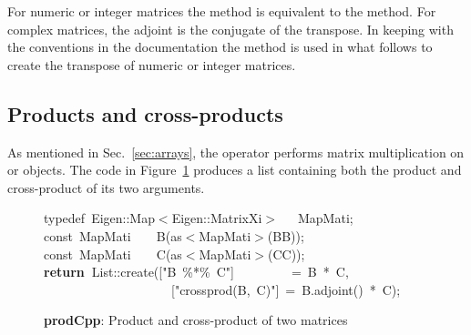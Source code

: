 \documentclass[shortnames,article]{jss}
\newcommand{\hlstd}[1]{\textcolor[rgb]{0,0,0}{#1}}
\newcommand{\hlopt}[1]{\textcolor[rgb]{0,0,0}{#1}}
\newcommand{\hlstr}[1]{\textcolor[rgb]{0.90,0.15,0.15}{#1}}
\newcommand{\hlkwa}[1]{\textcolor[rgb]{0.61,0.13,0.93}{\bf{#1}}}
\newcommand{\hlkwb}[1]{\textcolor[rgb]{0.13,0.54,0.13}{#1}}
\newcommand{\hlkwc}[1]{\textcolor[rgb]{0,0,1}{#1}}
\newcommand{\hlkwd}[1]{\textcolor[rgb]{0,0,0}{#1}}
\begin{document}
For numeric or integer matrices the  method is
equivalent to the  method.  For complex matrices,
the adjoint is the conjugate of the transpose.  In keeping with the
conventions in the  documentation the 
method is used in what follows to create the transpose of numeric or
integer matrices.


\subsection{Products and cross-products}
\label{sec:products}

As mentioned in Sec.~\ref{sec:arrays}, the  operator
performs matrix multiplication on  or
 objects. The  code in
Figure~\ref{prod} produces a list containing both the product and
cross-product of its two arguments.

\begin{figure}[htb]
  \noindent
  \ttfamily
  \hlstd{}\hlkwc{typedef\ }\hlstd{Eigen}\hlopt{::}\hlstd{Map}\hlopt{$<$}\hlstd{Eigen}\hlopt{::}\hlstd{MatrixXi}\hlopt{$>$}\hlstd{\ \ \ }\hlopt{}\hlstd{MapMati}\hlopt{;}\hspace*{\fill}\\
  \hlstd{}\hlkwb{const\ }\hlstd{MapMati}\hlstd{\ \ \ \ }\hlstd{}\hlkwd{B}\hlstd{}\hlopt{(}\hlstd{as}\hlopt{$<$}\hlstd{MapMati}\hlopt{$>$(}\hlstd{BB}\hlopt{));}\hspace*{\fill}\\
  \hlstd{}\hlkwb{const\ }\hlstd{MapMati}\hlstd{\ \ \ \ }\hlstd{}\hlkwd{C}\hlstd{}\hlopt{(}\hlstd{as}\hlopt{$<$}\hlstd{MapMati}\hlopt{$>$(}\hlstd{CC}\hlopt{));}\hspace*{\fill}\\
  \hlstd{}\hlkwa{return\ }\hlstd{List}\hlopt{::}\hlstd{}\hlkwd{create}\hlstd{}\hlopt{(}\hlstd{\textunderscore }\hlopt{{[}}\hlstd{}\hlstr{"B\ \%{*}\%\ C"}\hlstd{}\hlopt{{]}}\hlstd{\ \ \ \ \ \ \ \ \ }\hlopt{=\ }\hlstd{B\ }\hlopt{{*}\ }\hlstd{C}\hlopt{,}\hspace*{\fill}\\
  \hlstd{}\hlstd{\ \ \ \ \ \ \ \ \ \ \ \ \ \ \ \ \ \ \ \ }\hlstd{\textunderscore }\hlopt{{[}}\hlstd{}\hlstr{"crossprod(B,\ C)"}\hlstd{}\hlopt{{]}\ =\ }\hlstd{B}\hlopt{.}\hlstd{}\hlkwd{adjoint}\hlstd{}\hlopt{()\ {*}\ }\hlstd{C}\hlopt{);}\hlstd{}\hspace*{\fill}\\
  \mbox{}
  \normalfont
  \normalsize
  \caption{\textbf{prodCpp}: Product and cross-product of two matrices}
  \label{prod}
\end{figure}
\end{document}
